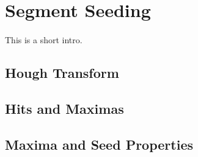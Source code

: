 \section{Segment Seeding}
\paragraph{}
This is a short intro.
\subsection{Hough Transform}
\subsection{Hits and Maximas}
\subsection{Maxima and Seed Properties}